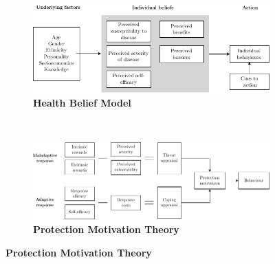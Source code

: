 \begin{figure}[htbp]
     \centering
     \vspace{.5cm}
     \begin{subfigure}[b]{\textwidth}
         \centering
         \begin{adjustbox}{center}
              \includegraphics[width=1\textwidth]{figures/ch5/hbm-conceptual-diagram.pdf}
         \end{adjustbox}
         \caption{\textbf{Health Belief Model}}
         \label{fig:hbm-conceptual-comparison}
     \end{subfigure}%
     \\ \vspace{1cm}
     \begin{subfigure}[b]{\textwidth}
         \centering
         \begin{adjustbox}{center}
            \includegraphics[width=1.2\textwidth]{figures/ch5/pmt-conceptual-diagram.pdf}
         \end{adjustbox}
         \caption{\textbf{Protection Motivation Theory}}
         \label{fig:pmt-conceptual-comparison}
     \end{subfigure}
    \label{fig:bct-conceptual-comparison}
\end{figure}

